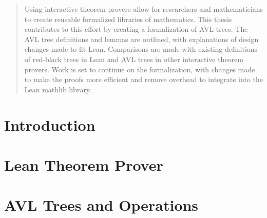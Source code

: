 \documentclass[11pt,oneside, a4paper, titlepage]{article}
\theoremstyle{definition}
\theoremstyle{definition}
\begin{document}



\newpage

\begin{abstract}
  Using interactive theorem provers allow for researchers and mathematicians to create reusable formalized libraries of mathematics. This thesis contributes to this effort by creating a formalization of AVL trees. The AVL tree definitions and lemmas are outlined, with explanations of design changes made to fit Lean. Comparisons are made with existing definitions of red-black trees in Lean and AVL trees in other interactive theorem provers. Work is set to continue on the formalization, with changes made to make the proofs more efficient and remove overhead to integrate into the Lean mathlib library.
\end{abstract}

\tableofcontents

\newpage

\section{Introduction}


\section{Lean Theorem Prover}


\section{AVL Trees and Operations}

\end{document}
